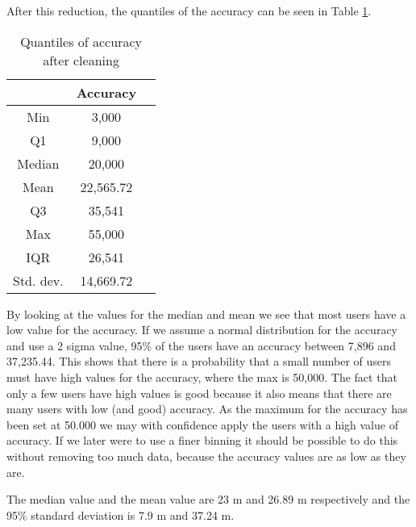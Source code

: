 After this reduction, the quantiles of the accuracy can be seen in Table \ref{tab:acc_quantiles}. 
 \begin{table}[htbp]
        \centering
        \small
        \setlength\tabcolsep{2pt}
        \begin{tabular}{|c|c|c|}
            \hline
                         & Accuracy      \\[0pt]
            \hline
                 Min     &  3,000       \\
            \hline
                 Q1      &  9,000   \\
            \hline
                 Median  &  20,000    \\
            \hline
                 Mean    &  22,565.72    \\
            \hline
                 Q3      &  35,541      \\
            \hline
                 Max &  55,000   \\
            \hline
                 IQR     &   26,541     \\
            \hline
                Std. dev.  &  14,669.72   \\
            \hline
        \end{tabular}
        \caption{Quantiles of accuracy after cleaning} %
        \label{tab:acc_quantiles}
\end{table}

By looking at the values for the median and mean we see that most users have a low value for the accuracy. If we assume a normal distribution for the accuracy and use a 2 sigma value, 95\% of the users have an accuracy between 7,896 and 37,235.44. This shows that there is a probability that a small number of users must have high values for the accuracy, where the max is 50,000. The fact that only a few users have high values is good because it also means that there are many users with low (and good) accuracy. As the maximum for the accuracy has been set at 50.000 we may with confidence apply the users with a high value of accuracy. If we later were to use a finer binning it should be possible to do this without removing too much data, because the accuracy values are as low as they are.   

The median value and the mean value are 23 m and 26.89 m respectively and the 95\% standard deviation is 7.9 m and 37.24 m. 


